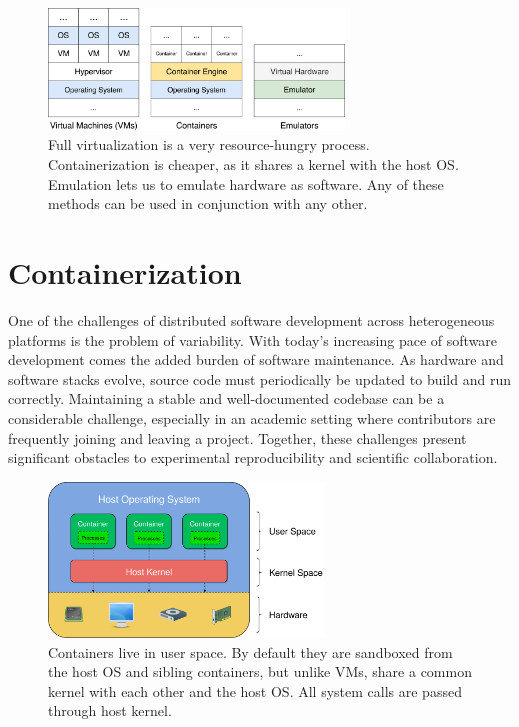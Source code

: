\documentclass[12pt,initial,twoside,maitrise]{dms}
\numberwithin{equation}{section}
\numberwithin{table}{chapter}
\numberwithin{figure}{chapter}
\begin{document}
\begin{figure}
    \centering
    \includegraphics[width=0.70\textwidth]{../figures/vms_containers_emulators.png}
    \caption{Full virtualization is a very resource-hungry process. Containerization is cheaper, as it shares a kernel with the host OS. Emulation lets us to emulate hardware as software. Any of these methods can be used in conjunction with any other.\vspace{-10pt}}
    \label{fig:vms_containers_emulators}
\end{figure}

\section{Containerization}\label{sec:containerization}

One of the challenges of distributed software development across heterogeneous platforms is the problem of variability. With today's increasing pace of software development comes the added burden of software maintenance. As hardware and software stacks evolve, source code must periodically be updated to build and run correctly. Maintaining a stable and well-documented codebase can be a considerable challenge, especially in an academic setting where contributors are frequently joining and leaving a project. Together, these challenges present significant obstacles to experimental reproducibility and scientific collaboration.

\begin{figure}[ht]
    \centering
    \includegraphics[width=0.65\textwidth]{../figures/user_kernel_hardware.png}
    \caption{Containers live in user space. By default they are sandboxed from the host OS and sibling containers, but unlike VMs, share a common kernel with each other and the host OS. All system calls are passed through host kernel.}
    \label{fig:user_kernel_hardware}
\end{figure}
\end{document}
